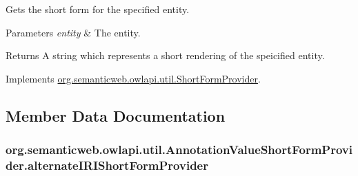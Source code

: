 Gets the short form for the specified entity. 
\begin{DoxyParams}{Parameters}
{\em entity} & The entity. \\
\hline
\end{DoxyParams}
\begin{DoxyReturn}{Returns}
A string which represents a short rendering of the speicified entity. 
\end{DoxyReturn}


Implements \hyperlink{interfaceorg_1_1semanticweb_1_1owlapi_1_1util_1_1_short_form_provider_aca40ef0eda3bf146115c473088cc305d}{org.\-semanticweb.\-owlapi.\-util.\-Short\-Form\-Provider}.



\subsection{Member Data Documentation}
\hypertarget{classorg_1_1semanticweb_1_1owlapi_1_1util_1_1_annotation_value_short_form_provider_a98ba0de563098b463b6c673d86e6c9c0}{
\subsubsection[{alternate\-I\-R\-I\-Short\-Form\-Provider}]{ org.\-semanticweb.\-owlapi.\-util.\-Annotation\-Value\-Short\-Form\-Provider.\-alternate\-I\-R\-I\-Short\-Form\-Provider\hspace{0.3cm}{\ttfamily [private]}}}\label{classorg_1_1semanticweb_1_1owlapi_1_1util_1_1_annotation_value_short_form_provider_a98ba0de563098b463b6c673d86e6c9c0}
